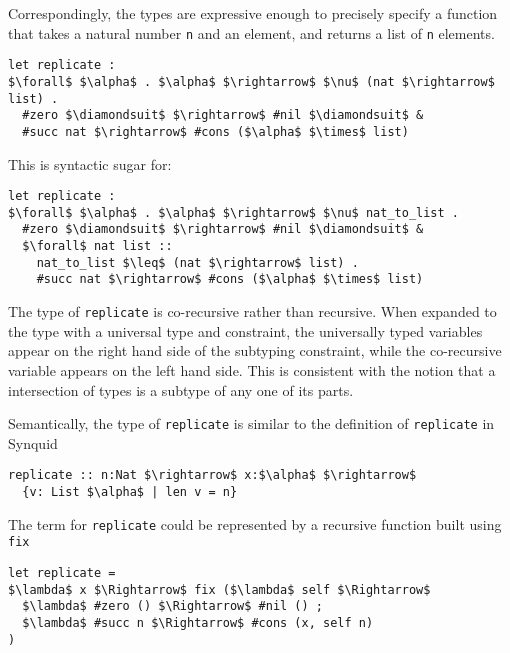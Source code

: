 \documentclass[sigplan,screen]{acmart}
\begin{document}
\hfill

\noindent Correspondingly, the types are expressive enough to precisely specify
a function that takes a natural number \lstinline{n} 
and an element, and returns a list of \lstinline{n} elements.

\begin{lstlisting}[]
let replicate : 
$\forall$ $\alpha$ . $\alpha$ $\rightarrow$ $\nu$ (nat $\rightarrow$ list) .
  #zero $\diamondsuit$ $\rightarrow$ #nil $\diamondsuit$ & 
  #succ nat $\rightarrow$ #cons ($\alpha$ $\times$ list)
\end{lstlisting}



\hfill

\noindent This is syntactic sugar for:

\begin{lstlisting}[]
let replicate : 
$\forall$ $\alpha$ . $\alpha$ $\rightarrow$ $\nu$ nat_to_list .
  #zero $\diamondsuit$ $\rightarrow$ #nil $\diamondsuit$ & 
  $\forall$ nat list :: 
    nat_to_list $\leq$ (nat $\rightarrow$ list) .
    #succ nat $\rightarrow$ #cons ($\alpha$ $\times$ list)
\end{lstlisting}

\hfill

\noindent The type of \lstinline{replicate} is co-recursive rather than recursive. 
When expanded to the type with a universal type and constraint, 
the universally typed variables appear on the right hand side 
of the subtyping constraint, while the co-recursive variable
appears on the left hand side. This is consistent with the notion
that a intersection of types is a subtype of any one of its parts.

\hfill

\noindent Semantically, the type of \lstinline{replicate} is similar to the definition of 
\lstinline{replicate} in Synquid \cite{}    

\begin{lstlisting}[keywords={termination, measure, data, where}]
replicate :: n:Nat $\rightarrow$ x:$\alpha$ $\rightarrow$ 
  {v: List $\alpha$ | len v = n}

\end{lstlisting}

\hfill

\noindent The term for \lstinline{replicate} could be represented by a recursive function built using \lstinline{fix} 

\begin{lstlisting}[]
let replicate = 
$\lambda$ x $\Rightarrow$ fix ($\lambda$ self $\Rightarrow$
  $\lambda$ #zero () $\Rightarrow$ #nil () ;
  $\lambda$ #succ n $\Rightarrow$ #cons (x, self n)
) 
\end{lstlisting}
\end{document}
